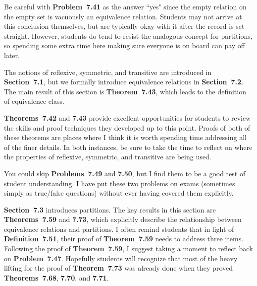 \documentclass[11pt]{article}%
\newcommand{\blankline}{\pagebreak[2]\vspace{.5\baselineskip}}
\begin{document}
\blankline

Be careful with \textbf{Problem~7.41} as the answer ``yes" since the empty relation on the empty set is vacuously an equivalence relation.  Students may not arrive at this conclusion themselves, but are typically okay with it after the record is set straight.  However, students do tend to resist the analogous concept for partitions, so spending some extra time here making sure everyone is on board can pay off later. 

The notions of reflexive, symmetric, and transitive are introduced in \textbf{Section~7.1}, but we formally introduce equivalence relations in \textbf{Section~7.2}. The main result of this section is \textbf{Theorem~7.43}, which leads to the definition of equivalence class.  

\blankline

\textbf{Theorems~7.42} and \textbf{7.43} provide excellent opportunities for students to review the skills and proof techniques they developed up to this point.  Proofs of both of these theorems are places where I think it is worth spending time addressing all of the finer details.  In both instances, be sure to take the time to reflect on where the properties of reflexive, symmetric, and transitive are being used.

\blankline

You could skip \textbf{Problems~7.49} and \textbf{7.50}, but I find them to be a good test of student understanding.  I have put these two problems on exams (sometimes simply as true/false questions) without ever having covered them explicitly.

\blankline

\textbf{Section~7.3} introduces partitions.  The key results in this section are \textbf{Theorems~7.59} and \textbf{7.73}, which explicitly describe the relationship between equivalence relations and partitions.  I often remind students that in light of \textbf{Definition~7.51}, their proof of \textbf{Theorem~7.59} needs to address three items. Following the proof of \textbf{Theorem~7.59}, I suggest taking a moment to reflect back on \textbf{Problem~7.47}. Hopefully students will recognize that most of the heavy lifting for the proof of \textbf{Theorem~7.73} was already done when they proved \textbf{Theorems~7.68}, \textbf{7.70}, and \textbf{7.71}.

\blankline
\end{document}
